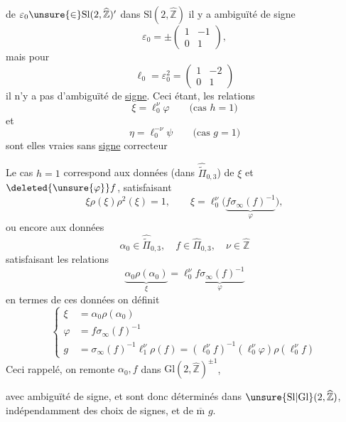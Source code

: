 de $\varepsilon_0\unsure{\in}\mathrm{Sl}(2,\widehat{\mathbb Z})'$ dans $\mathrm{Sl}(2,\widehat{\mathbb Z})$ il y a ambiguïté de signe
\[
 \varepsilon_0=\pm\begin{pmatrix}1&-1\\0&1\end{pmatrix},
\]
mais pour
\[
 \ell_0=\varepsilon_0^2=\begin{pmatrix}1&-2\\0&1\end{pmatrix}
 \tag{39}
\]
il n'y a pas d'ambiguïté de \uline{signe}. Ceci étant, les relations
\[
 \xi=\ell_0^\nu\varphi\qquad\text{(cas }h=1\text{)}
 \tag{40}
\]
et
\[
 \eta=\ell_0^{-\nu}\psi\qquad\text{(cas }g=1\text{)}
 \tag{41}
\]
sont elles vraies sans \uline{signe} correcteur 

Le cas $h=1$ correspond aux données (dans $\widehat{\widetilde{\Pi}}_{0,3}$) de $\xi$ et $\deleted{\unsure{\varphi}}f$,  satisfaisant
\[
 \xi\rho(\xi)\rho^2(\xi)=1,\qquad
 \xi=\ell_0^\nu
 \bigl(\underbrace{f\sigma_\infty(f)^{-1}}_{\varphi}\bigr),
\]
ou encore aux données
\[
 \alpha_0\in\widehat{\widetilde{\Pi}}_{0,3},\quad
 f\in\widehat{\Pi}_{0,3},\quad\nu\in\widehat{\mathbb Z}
\]
satisfaisant les relations
\[
 \underbrace{\alpha_0\rho(\alpha_0)}_{\xi}
 =\ell_0^\nu\underbrace{f\sigma_\infty(f)^{-1}}_{\varphi}
 \tag{42}
\]
en termes de ces données on définit
\[
 \left\{\begin{aligned}
 \xi&=\alpha_0\rho(\alpha_0)\\
 \varphi&=f\sigma_\infty(f)^{-1}\\
 g&=\sigma_\infty(f)^{-1}\ell_1^\nu\rho(f)
 =(\ell_0^\nu f)^{-1}(\ell_0^\nu\varphi)\rho(\ell_0^\nu f)
 \end{aligned}\right.
 \tag{43}
\]
Ceci rappelé, on remonte $\alpha_0,f$ dans $\mathrm{Gl}(2,\widehat{\mathbb Z})^{\pm1}$,


avec ambiguïté de signe,  et  sont donc déterminés dans $\unsure{\mathrm{Sl}|\mathrm{Gl}}(2,\widehat{\mathbb Z})$, indépendamment des choix de signes,  et de $\overline{\mathrm m}$ $g$.

